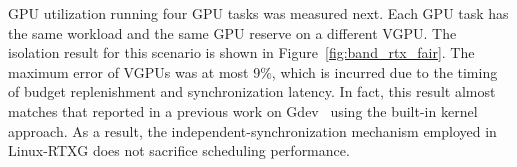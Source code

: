 GPU utilization running four GPU tasks was measured next.
Each GPU task has the same workload and the same GPU reserve on a different VGPU.
The isolation result for this scenario is shown in Figure~\ref{fig:band_rtx_fair}.
The maximum error of VGPUs was at most 9\%, which is incurred due to the timing of budget replenishment and synchronization latency.
In fact, this result almost matches that reported in a previous work on Gdev~\cite{kato:gdev} using the built-in kernel approach.
As a result, the independent-synchronization mechanism employed in Linux-RTXG does not sacrifice scheduling performance.


\begin{figure}[!t]
\begin{minipage}[t]{0.33\hsize}
\begin{center}
\label{fig:real-null_null}
\label{fig:real-prio_null}
\end{center}
\end{minipage}
\begin{minipage}[t]{0.33\hsize}
\begin{center}

\end{center}
\end{minipage}
\end{figure}
